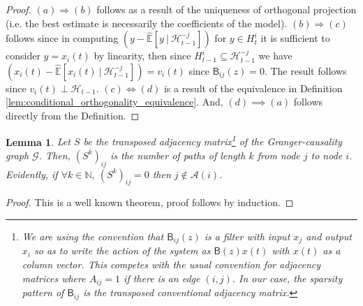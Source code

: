 \documentclass{statsoc}
\def\gcg{\mathcal{G}}  %
\def\B{\mathsf{B}}  %
\def\H{\mathcal{H}}  %
\newcommand{\linE}[2]{\hat{\E}[#1\ |\ #2]}  %
\newcommand{\anc}[1]{\mathcal{A}(#1)}  %
\newtheorem{lemma}{Lemma}
\def\H{\mathcal{H}}  %
\def\E{\mathbb{E}}  %
\def\N{\mathbb{N}}  %
\begin{document}
\begin{proof}

  $(a) \Rightarrow (b)$ follows as a result of the uniqueness of orthogonal
  projection (i.e. the best estimate is necessarily the coefficients
  of the model).  $(b) \Rightarrow (c)$ follows since in computing
  $(y - \linE{y}{\H_{t - 1}^{-j}})$ for $y \in H_t^i$ it is sufficient
  to consider $y = x_i(t)$ by linearity, then since
  $H_{t - 1}^i \subseteq \H_{t - 1}^{-j}$ we have
  $(x_i(t) - \linE{x_i(t)}{\H_{t - 1}^{-j}}) = v_i(t)$ since
  $\B_{ij}(z) = 0$.  The result follows since
  $v_i(t) \perp \H_{t - 1}$.  $(c) \iff (d)$ is a result of the equivalence
  in Definition \ref{lem:conditional_orthogonality_equivalence}.  And,
  $(d) \implies (a)$ follows directly from the Definition.
\end{proof}

\begin{lemma}
  \label{lem:adj_matrix}
  Let $S$ be the transposed adjacency matrix\footnote{\footnotesize We
    are using the convention that $\B_{ij}(z)$ is a filter with input
    $x_j$ and output $x_i$ so as to write the action of the system as
    $\B(z)x(t)$ with $x(t)$ as a column vector.  This competes with
    the usual convention for adjacency matrices where $A_{ij} = 1$ if
    there is an edge $(i, j)$.  In our case, the sparsity pattern of
    $\B_{ij}$ is the \textit{transposed} conventional adjacency
    matrix.} of the Granger-causality graph $\gcg$.  Then,
  $(S^k)_{ij}$ is the number of paths of length $k$ from node $j$ to
  node $i$.  Evidently, if $\forall k \in \N,\ (S^k)_{ij} = 0$ then
  $j \not\in \anc{i}$.
\end{lemma}
\begin{proof}
  This is a well known theorem, proof follows by induction.
\end{proof}
\end{document}
